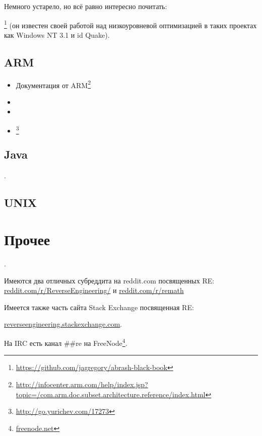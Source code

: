 Немного устарело, но всё равно интересно почитать:

\MAbrash\footnote{\AlsoAvailableAs \url{https://github.com/jagregory/abrash-black-book}}
(он известен своей работой над низкоуровневой оптимизацией в таких проектах как Windows NT 3.1 и id Quake).

\subsection{ARM}

\begin{itemize}
\item Документация от ARM\footnote{\AlsoAvailableAs \url{http://infocenter.arm.com/help/index.jsp?topic=/com.arm.doc.subset.architecture.reference/index.html}}

\item \ARMSevenRef

\item \ARMSixFourRefURL

\item \ARMCookBook\footnote{\AlsoAvailableAs \url{http://go.yurichev.com/17273}}
\end{itemize}

\subsection{Java}

\JavaBook.

\subsection{UNIX}

\TAOUP



\section{Прочее}

\HenryWarren.

Имеются два отличных субреддита на reddit.com посвященных \ac{RE}:
\href{http://go.yurichev.com/17027}{reddit.com/r/ReverseEngineering/} и
\href{http://go.yurichev.com/17028}{reddit.com/r/remath}

Имеется также часть сайта Stack Exchange посвященная \ac{RE}:

\par \href{http://go.yurichev.com/17029}{reverseengineering.stackexchange.com}.

На IRC есть канал \#\#re на
FreeNode\footnote{\href{http://go.yurichev.com/17030}{freenode.net}}.

